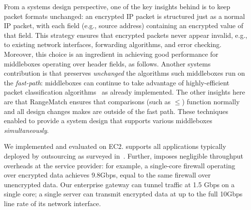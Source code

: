   From a systems design perspective, one of the key insights behind \sys is to keep packet formats unchanged: an encrypted IP packet is structured just as a normal IP packet, with each field (e.g., source address) containing an encrypted value of that field.
  This strategy ensures that encrypted packets never appear invalid, e.g., to existing network interfaces, forwarding algorithms, and error checking. 
Moreover, this choice is an ingredient in achieving good performance for middleboxes operating over header fields, as follows.
  Another systems contribution  is that \sys preserves {\em unchanged} the algorithms such middleboxes run on the {\em fast-path}:  middleboxes can continue to take advantage of highly-efficient packet classification algorithms~\cite{packet_classif} as already implemented. The other insights here are that RangeMatch ensures that comparisons (such as $\leq$) function normally and  all design changes \sys makes  are outside of the fast path. These techniques enabled \sys to provide a system design that supports various middleboxes {\em simultaneously}.
   

 
We implemented and evaluated \sys on EC2. \sys supports all applications typically deployed by outsourcing as surveyed in~\cite{aplomb}.
Further, \sys imposes  negligible throughput overheads at the service provider: for example, a single-core firewall operating over encrypted data achieves 9.8Gbps, equal to the same firewall over unencrypted data.
Our enterprise gateway can tunnel traffic at 1.5 Gbps on a single core;  a single server can transmit \sys encrypted data at up to the full 10Gbps line rate of its network interface.

